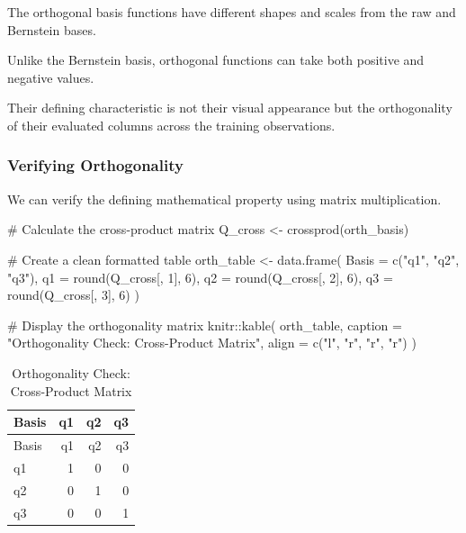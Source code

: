 \documentclass[
  letterpaper,
  DIV=11,
  numbers=noendperiod]{scrreprt}
\newenvironment{Shaded}{\begin{snugshade}}{\end{snugshade}}
\newcommand{\AttributeTok}[1]{\textcolor[rgb]{0.40,0.45,0.13}{#1}}
\newcommand{\CommentTok}[1]{\textcolor[rgb]{0.37,0.37,0.37}{#1}}
\newcommand{\DecValTok}[1]{\textcolor[rgb]{0.68,0.00,0.00}{#1}}
\newcommand{\FunctionTok}[1]{\textcolor[rgb]{0.28,0.35,0.67}{#1}}
\newcommand{\NormalTok}[1]{\textcolor[rgb]{0.00,0.23,0.31}{#1}}
\newcommand{\OtherTok}[1]{\textcolor[rgb]{0.00,0.23,0.31}{#1}}
\newcommand{\SpecialCharTok}[1]{\textcolor[rgb]{0.37,0.37,0.37}{#1}}
\newcommand{\StringTok}[1]{\textcolor[rgb]{0.13,0.47,0.30}{#1}}
\begin{document}
The orthogonal basis functions have different shapes and scales from the
raw and Bernstein bases.

Unlike the Bernstein basis, orthogonal functions can take both positive
and negative values.

Their defining characteristic is not their visual appearance but the
orthogonality of their evaluated columns across the training
observations.

\subsubsection{Verifying Orthogonality}\label{verifying-orthogonality}

We can verify the defining mathematical property using matrix
multiplication.

\begin{Shaded}
\begin{Highlighting}[]
\CommentTok{\# Calculate the cross{-}product matrix}
\NormalTok{Q\_cross }\OtherTok{\textless{}{-}} \FunctionTok{crossprod}\NormalTok{(orth\_basis)}

\CommentTok{\# Create a clean formatted table}
\NormalTok{orth\_table }\OtherTok{\textless{}{-}} \FunctionTok{data.frame}\NormalTok{(}
  \AttributeTok{Basis =} \FunctionTok{c}\NormalTok{(}\StringTok{"q1"}\NormalTok{, }\StringTok{"q2"}\NormalTok{, }\StringTok{"q3"}\NormalTok{),}
  \AttributeTok{q1 =} \FunctionTok{round}\NormalTok{(Q\_cross[, }\DecValTok{1}\NormalTok{], }\DecValTok{6}\NormalTok{),}
  \AttributeTok{q2 =} \FunctionTok{round}\NormalTok{(Q\_cross[, }\DecValTok{2}\NormalTok{], }\DecValTok{6}\NormalTok{),}
  \AttributeTok{q3 =} \FunctionTok{round}\NormalTok{(Q\_cross[, }\DecValTok{3}\NormalTok{], }\DecValTok{6}\NormalTok{)}
\NormalTok{)}

\CommentTok{\# Display the orthogonality matrix}
\NormalTok{knitr}\SpecialCharTok{::}\FunctionTok{kable}\NormalTok{(}
\NormalTok{  orth\_table,}
  \AttributeTok{caption =} \StringTok{"Orthogonality Check: Cross{-}Product Matrix"}\NormalTok{,}
  \AttributeTok{align =} \FunctionTok{c}\NormalTok{(}\StringTok{"l"}\NormalTok{, }\StringTok{"r"}\NormalTok{, }\StringTok{"r"}\NormalTok{, }\StringTok{"r"}\NormalTok{)}
\NormalTok{)}
\end{Highlighting}
\end{Shaded}

\begin{longtable}[]{@{}lrrr@{}}
\caption{Orthogonality Check: Cross-Product Matrix}\tabularnewline
\toprule\noalign{}
Basis & q1 & q2 & q3 \\
\midrule\noalign{}
\endfirsthead
\toprule\noalign{}
Basis & q1 & q2 & q3 \\
\midrule\noalign{}
\endhead
\bottomrule\noalign{}
\endlastfoot
q1 & 1 & 0 & 0 \\
q2 & 0 & 1 & 0 \\
q3 & 0 & 0 & 1 \\
\end{longtable}
\end{document}
